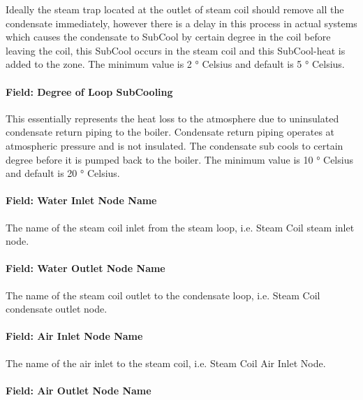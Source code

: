 Ideally the steam trap located at the outlet of steam coil should remove all the condensate immediately, however there is a delay in this process in actual systems which causes the condensate to SubCool by certain degree in the coil before leaving the coil, this SubCool occurs in the steam coil and this SubCool-heat is added to the zone. The minimum value is 2 ° Celsius and default is 5 ° Celsius.

\paragraph{Field: Degree of Loop SubCooling}\label{field-degree-of-loop-subcooling}

This essentially represents the heat loss to the atmosphere due to uninsulated condensate return piping to the boiler. Condensate return piping operates at atmospheric pressure and is not insulated. The condensate sub cools to certain degree before it is pumped back to the boiler. The minimum value is 10 ° Celsius and default is 20 ° Celsius.

\paragraph{Field: Water Inlet Node Name}\label{field-water-inlet-node-name-2-000}

The name of the steam coil inlet from the steam loop, i.e. Steam Coil steam inlet node.

\paragraph{Field: Water Outlet Node Name}\label{field-water-outlet-node-name-2-000}

The name of the steam coil outlet to the condensate loop, i.e. Steam Coil condensate outlet node.

\paragraph{Field: Air Inlet Node Name}\label{field-air-inlet-node-name-2-001}

The name of the air inlet to the steam coil, i.e. Steam Coil Air Inlet Node.

\paragraph{Field: Air Outlet Node Name}\label{field-air-outlet-node-name-2-001}

